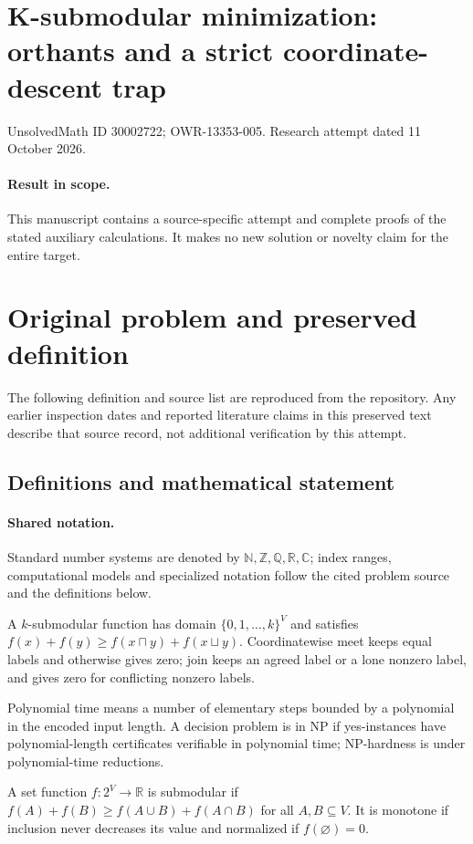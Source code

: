 \documentclass[11pt]{article}
\begin{document}
\section*{K-submodular minimization: orthants and a strict coordinate-descent trap}
\noindent UnsolvedMath ID 30002722; OWR-13353-005. Research attempt dated 11 October 2026.
\paragraph{Result in scope.}This manuscript contains a source-specific attempt and complete proofs of the stated auxiliary calculations. It makes no new solution or novelty claim for the entire target.
\section{Original problem and preserved definition}
The following definition and source list are reproduced from the repository. Any earlier inspection dates and reported literature claims in this preserved text describe that source record, not additional verification by this attempt.
\subsection{Definitions and mathematical statement}

\paragraph{Shared notation.}Standard number systems are denoted by $\mathbb N,\mathbb Z,\mathbb Q,\mathbb R,\mathbb C$; index ranges, computational models and specialized notation follow the cited problem source and the definitions below.


A $k$-submodular function has domain $\{0,1,\ldots,k\}^V$ and satisfies $f(x)+f(y)\geq f(x\sqcap y)+f(x\sqcup y)$. Coordinatewise meet keeps equal labels and otherwise gives zero; join keeps an agreed label or a lone nonzero label, and gives zero for conflicting nonzero labels.

Polynomial time means a number of elementary steps bounded by a polynomial in the encoded input length. A decision problem is in $\mathrm{NP}$ if yes-instances have polynomial-length certificates verifiable in polynomial time; NP-hardness is under polynomial-time reductions.

A set function $f:2^V\to\mathbb R$ is submodular if $f(A)+f(B)\geq f(A\cup B)+f(A\cap B)$ for all $A,B\subseteq V$. It is monotone if inclusion never decreases its value and normalized if $f(\varnothing)=0$.
\end{document}
